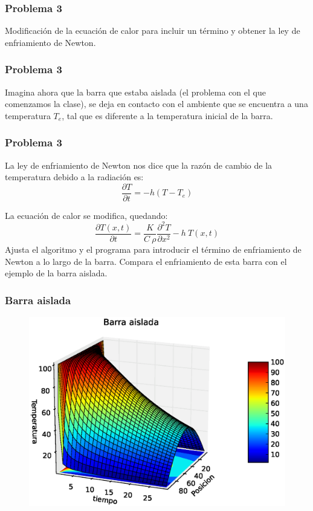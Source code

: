 \documentclass[12pt]{beamer}
\begin{document}
\begin{frame}
\frametitle{Problema 3}
Modificación de la ecuación de calor para incluir un término y obtener la ley de enfriamiento de Newton.
\end{frame}
\begin{frame}
\frametitle{Problema 3}
Imagina ahora que la barra que estaba aislada (el problema con el que comenzamos la clase), se deja en contacto con el ambiente que se encuentra a una temperatura $T_{e}$, tal que es diferente a la temperatura inicial de la barra.
\end{frame}
\begin{frame}
\frametitle{Problema 3}
La ley de enfriamiento de Newton nos dice que la razón de cambio de la temperatura debido a la radiación es:
\[ \dfrac{\partial T}{\partial t} = - h (T- T_{e}) \]
\end{frame}
\begin{frame}
La ecuación de calor se modifica, quedando:
\[ \dfrac{\partial T(x,t)}{\partial t} = \dfrac{K}{C \: \rho} \dfrac{\partial^{2}T}{\partial x^{2}} - h \: T(x,t)\]
Ajusta el algoritmo y el programa para introducir el término de enfriamiento de Newton a lo largo de la barra. Compara el enfriamiento de esta barra con el ejemplo de la barra aislada.
\end{frame}
\begin{frame}
\frametitle{Barra aislada}
\begin{figure}
	\centering
	\includegraphics[scale=0.5]{Imagenes/EqCalor08.eps}  
\end{figure}
\end{frame}
\end{document}
